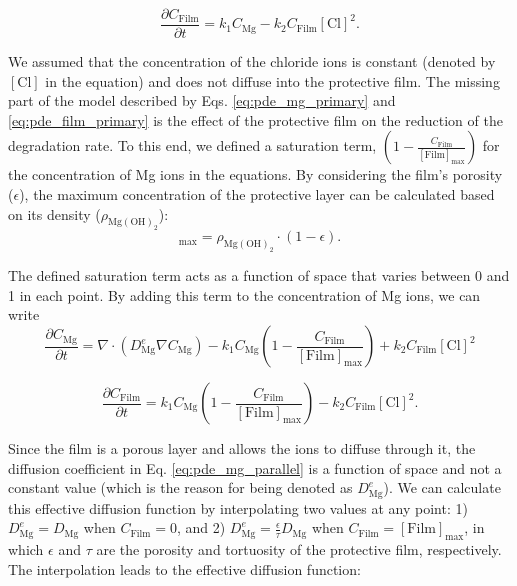 \begin{equation} \label{eq:pde_film_primary}
\frac{\partial C_\mathrm{Film}}{\partial t}=k_{1} C_{\mathrm{Mg}} -k_{2} C_{\mathrm{Film}} [\mathrm{Cl}]^{2}.
\end{equation}

\noindent We assumed that the concentration of the chloride ions is constant (denoted by $[\mathrm{Cl}]$ in the equation) and does not diffuse into the protective film. The missing part of the model described by Eqs. \ref{eq:pde_mg_primary} and \ref{eq:pde_film_primary} is the effect of the protective film on the reduction of the degradation rate. To this end, we defined a saturation term, $(1-\frac{C_{\mathrm{Film}}}{[\mathrm{Film}]_{\max }})$ for the concentration of Mg ions in the equations. By considering the film's porosity ($\epsilon$), the maximum concentration of the protective layer can be calculated based on its density ($\rho_{\mathrm{Mg}(\mathrm{OH})_{2}}$):
\begin{equation}
[\mathrm{Film}]_{\max }=\rho_{\mathrm{Mg}(\mathrm{OH})_{2}} \cdot (1-\epsilon).
\end{equation}

The defined saturation term acts as a function of space that varies between 0 and 1 in each point. By adding this term to the concentration of Mg ions, we can write
\begin{equation} \label{eq:pde_mg_parallel}
\frac{\partial C_{\mathrm{Mg}}}{\partial t}=\nabla \cdot \left(D_{\mathrm{Mg}}^{e}  \nabla C_{\mathrm{Mg}} \right)-k_{1} C_{\mathrm{Mg}}\left(1-\frac{C_{\mathrm{Film}}}{[\mathrm{Film}]_{\max }}\right) +k_{2} C_{\mathrm{Film}} [\mathrm{Cl}]^{2}
\end{equation}

\begin{equation} \label{eq:pde_film_parallel}
\frac{\partial C_\mathrm{Film}}{\partial t}=k_{1} C_{\mathrm{Mg}}\left(1-\frac{C_{\mathrm{Film}}}{[\mathrm{Film}]_{\max }}\right) -k_{2} C_{\mathrm{Film}} [\mathrm{Cl}]^{2}.
\end{equation}

Since the film is a porous layer and allows the ions to diffuse through it, the diffusion coefficient in Eq. \ref{eq:pde_mg_parallel} is a function of space and not a constant value (which is the reason for being denoted as $D_{\mathrm{Mg}}^{e}$). We can calculate this effective diffusion function by interpolating two values at any point: 1) $D_{\mathrm{Mg}}^{e} = D_{\mathrm{Mg}}$ when $C_\mathrm{Film} = 0$, and 2) $D_{\mathrm{Mg}}^{e} = \frac{\epsilon}{\tau} D_{\mathrm{Mg}}$ when $C_\mathrm{Film} = [\mathrm{Film}]_{\max }$, in which $\epsilon$ and $\tau$ are the porosity and tortuosity of the protective film, respectively. The interpolation leads to the effective diffusion function:

